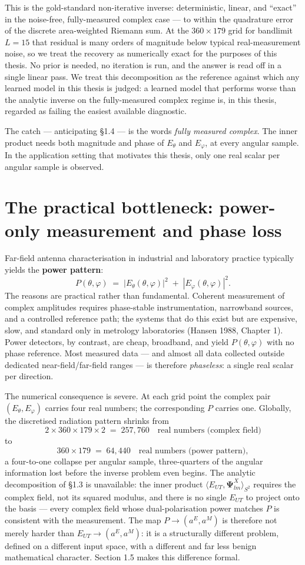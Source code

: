 \documentclass[11pt,a4paper]{report}
\begin{document}
This is the gold-standard non-iterative inverse: deterministic, linear, and
\enquote{exact} in the noise-free, fully-measured complex case --- to within the
quadrature error of the discrete area-weighted Riemann sum. At the
$360 \times 179$ grid for bandlimit $L=15$ that residual is many orders of magnitude
below typical real-measurement noise, so we treat the recovery as numerically exact
for the purposes of this thesis. No prior is needed, no iteration is run, and the
answer is read off in a single linear pass. We treat this decomposition as the
reference against which any learned model in this thesis is judged: a learned model
that performs worse than the analytic inverse on the fully-measured complex regime is,
in this thesis, regarded as failing the easiest available diagnostic.

The catch --- anticipating \S1.4 --- is the words \emph{fully measured complex}. The
inner product needs both magnitude and phase of $E_\theta$ and $E_\varphi$, at every
angular sample. In the application setting that motivates this thesis, only one real
scalar per angular sample is observed.
\section{The practical bottleneck: power-only measurement and phase loss}

Far-field antenna characterisation in industrial and laboratory practice typically
yields the \textbf{power pattern}:
\[
P(\theta,\varphi) \;=\; |E_\theta(\theta,\varphi)|^2 \;+\; |E_\varphi(\theta,\varphi)|^2.
\]
The reasons are practical rather than fundamental. Coherent measurement of complex
amplitudes requires phase-stable instrumentation, narrowband sources, and a controlled
reference path; the systems that do this exist but are expensive, slow, and standard
only in metrology laboratories (Hansen 1988, Chapter 1). Power detectors, by
contrast, are cheap, broadband, and yield $P(\theta,\varphi)$ with no phase reference.
Most measured data --- and almost all data collected outside dedicated
near-field/far-field ranges --- is therefore \emph{phaseless}: a single real scalar
per direction.

The numerical consequence is severe. At each grid point the complex pair
$(E_\theta, E_\varphi)$ carries four real numbers; the corresponding $P$ carries one.
Globally, the discretised radiation pattern shrinks from
\[
2 \times 360\times 179\times 2 \;=\; 257{,}760 \quad\text{real numbers (complex field)}
\]
to
\[
360\times 179 \;=\; 64{,}440 \quad\text{real numbers (power pattern)},
\]
a four-to-one collapse per angular sample, three-quarters of the angular information
lost before the inverse problem even begins. The analytic decomposition of \S1.3 is
unavailable: the inner product
$\langle E_{UT}, \boldsymbol{\Psi}^X_{lm}\rangle_{S^2}$ requires the complex field,
not its squared modulus, and there is no single $E_{UT}$ to project onto the basis
--- every complex field whose dual-polarisation power matches $P$ is consistent with
the measurement. The map $P \to (a^E, a^M)$ is therefore not merely harder than
$E_{UT} \to (a^E, a^M)$: it is a structurally different problem, defined on a
different input space, with a different and far less benign mathematical character.
Section 1.5 makes this difference formal.
\end{document}
